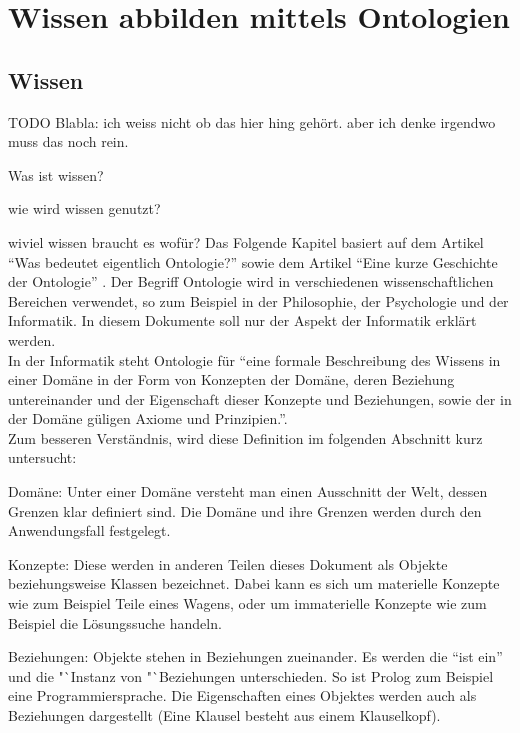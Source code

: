 \chapter{Wissen abbilden mittels Ontologien}
\label{chap:ontologien}

\section{Wissen}
\label{sec:ontologien_wissen}

TODO Blabla: ich weiss nicht ob das hier hing gehört. aber ich denke irgendwo muss das noch rein.

Was ist wissen?

wie wird wissen genutzt?

wiviel wissen braucht es wofür?
Das Folgende Kapitel basiert auf dem Artikel "`Was bedeutet eigentlich Ontologie?"'\cite{IspekOntoBedeutung} sowie dem Artikel "`Eine kurze Geschichte der Ontologie"' \cite{ISpekOntoGeschichte}.
Der Begriff Ontologie wird in verschiedenen wissenschaftlichen Bereichen verwendet, so zum Beispiel in der Philosophie, der Psychologie und der Informatik. In diesem Dokumente soll nur der Aspekt der Informatik erklärt werden. \\
In der Informatik steht Ontologie für "`eine formale Beschreibung des Wissens in einer Domäne in der Form von Konzepten der Domäne, deren Beziehung untereinander und der Eigenschaft dieser Konzepte und Beziehungen, sowie der in der Domäne güligen Axiome und Prinzipien."'\cite[S.310]{ISpekOntoGeschichte}.\\
Zum besseren Verständnis, wird diese Definition im folgenden Abschnitt kurz untersucht:

Domäne: Unter einer Domäne versteht man einen Ausschnitt der Welt, dessen Grenzen klar definiert sind. Die Domäne und ihre Grenzen werden durch den Anwendungsfall festgelegt.

Konzepte: Diese werden in anderen Teilen dieses Dokument als Objekte beziehungsweise Klassen bezeichnet. Dabei kann es sich um materielle Konzepte wie zum Beispiel Teile eines Wagens, oder um immaterielle Konzepte wie zum Beispiel die Lösungssuche handeln.

Beziehungen: Objekte stehen in Beziehungen zueinander. Es werden die "`ist ein"' und die "`Instanz von "`Beziehungen unterschieden. So ist Prolog zum Beispiel eine Programmiersprache. Die Eigenschaften eines Objektes werden auch als Beziehungen dargestellt (Eine Klausel besteht aus einem Klauselkopf).

